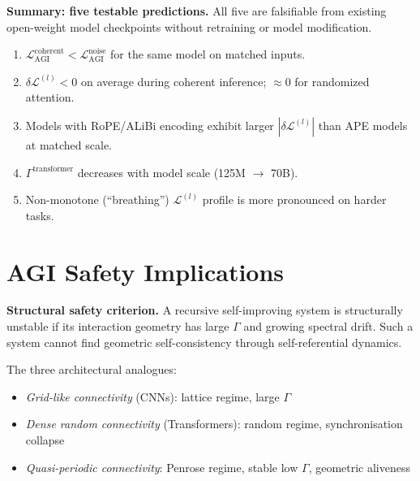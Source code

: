 \documentclass[12pt,a4paper]{article}
\theoremstyle{plain}
\theoremstyle{definition}
\begin{document}
\begin{keyresult}
\textbf{Summary: five testable predictions.} All five are falsifiable
from existing open-weight model checkpoints without retraining or model
modification.
\begin{enumerate}[label=(\roman*)]
  \item $\mathcal{L}_{\text{AGI}}^{\text{coherent}} <
        \mathcal{L}_{\text{AGI}}^{\text{noise}}$ for the same model on
        matched inputs.
  \item $\delta\mathcal{L}^{(l)} < 0$ on average during coherent
        inference; $\approx 0$ for randomized attention.
  \item Models with RoPE/ALiBi encoding exhibit larger
        $|\delta\mathcal{L}^{(l)}|$ than APE models at matched scale.
  \item $\Gamma^{\text{transformer}}$ decreases with model scale
        (125M $\to$ 70B).
  \item Non-monotone (``breathing'') $\mathcal{L}^{(l)}$ profile is
        more pronounced on harder tasks.
\end{enumerate}
\end{keyresult}

\section{AGI Safety Implications}
\label{sec:agi}

\begin{keyresult}
\textbf{Structural safety criterion.} A recursive self-improving system
is structurally unstable if its interaction geometry has large $\Gamma$
and growing spectral drift. Such a system cannot find geometric
self-consistency through self-referential dynamics.
\end{keyresult}

The three architectural analogues:
\begin{itemize}
  \item \emph{Grid-like connectivity} (CNNs): lattice regime, large
        $\Gamma$
  \item \emph{Dense random connectivity} (Transformers): random regime,
        synchronisation collapse
  \item \emph{Quasi-periodic connectivity}: Penrose regime, stable low
        $\Gamma$, geometric aliveness
\end{itemize}
\end{document}
